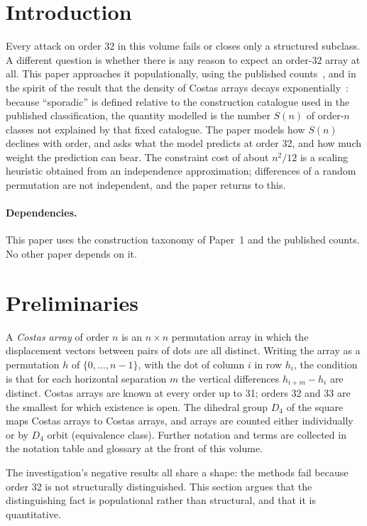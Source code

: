 \documentclass[11pt,a4paper,oneside]{report}
\theoremstyle{definition}
\begin{document}
\section{Introduction}\label{p6-sec:paperintro}
Every attack on order 32 in this volume fails or closes only a structured subclass. A different
question is whether there is any reason to expect an order-32 array at all. This paper approaches it populationally, using the published counts~\cite{p6-drakakis27,p6-drakakis28,p6-drakakis29,p6-oeis}, and in the spirit of the result that the density of Costas arrays decays exponentially~\cite{p6-warnke}: because ``sporadic'' is defined relative to the construction catalogue used in the published classification, the quantity modelled is the number $S(n)$ of order-$n$ classes not explained by that fixed catalogue. The paper models how $S(n)$ declines with order, and asks what the
model predicts at order 32, and how much weight the prediction can bear. The constraint cost of about $n^2/12$ is a scaling heuristic obtained from an independence approximation; differences of a random permutation are not independent, and the paper returns to this.

\paragraph{Dependencies.} This paper uses the construction taxonomy of Paper~1 and the published counts. No other paper depends on it.

\section{Preliminaries}\label{p6-sec:notation}
A \emph{Costas array} of order $n$ is an $n\times n$ permutation array in which the displacement
vectors between pairs of dots are all distinct. Writing the array as a permutation $h$ of
$\{0,\dots,n-1\}$, with the dot of column $i$ in row $h_i$, the condition is that for each
horizontal separation $m$ the vertical differences $h_{i+m}-h_i$ are distinct. Costas arrays are
known at every order up to 31; orders 32 and 33 are the smallest for which existence is open. The
dihedral group $D_4$ of the square maps Costas arrays to Costas arrays, and arrays are counted
either individually or by $D_4$ orbit (equivalence class). Further notation and terms are collected
in the notation table and glossary at the front of this volume.


The investigation's negative results all share a shape: the methods fail because
order 32 is not structurally distinguished. This section argues that the
distinguishing fact is populational rather than structural, and that it is
quantitative.
\end{document}
